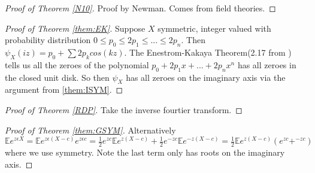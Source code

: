 \documentclass[10pt]{article}
\newcommand{\E}{\mathbb{E}}
\newcommand{\1}{\textbf{1}}
\theoremstyle{remark}
\theoremstyle{definition}
\begin{document}
\begin{proof}[Proof of Theorem \ref{N10}]
	Proof by Newman. Comes from field theories.
\end{proof}


\begin{proof}[Proof of Theorem \ref{them:EK}]
	Suppose $X$ symmetric, integer valued with probability distribution $0 \leq p_0 \leq 2p_1 \leq ... \leq 2p_n$. Then $\psi_X(iz) = p_0 + \sum 2p_k cos(kz)$. The Enestrom-Kakaya Theorem(2.17 from \cite{HP}) tells us all the zeroes of the polynomial $p_0 +2p_1x+...+2p_nx^n$ has all zeroes in the closed unit disk. So then $\psi_X$ has all zeroes on the imaginary axis via the argument from \ref{them:ISYM}.
\end{proof}

\begin{proof}[Proof of Theorem \ref{RDP}]
	Take the inverse fourtier transform.
\end{proof}

\begin{proof}[Proof of Theorem \ref{them:GSYM}]

	Alternatively $\E e^{z \epsilon X} = \E e^{z\epsilon (X-c)}e^{z\epsilon c} = \frac{1}{2}e^{zc}\E e^{z(X-c)}+\frac{1}{2}e^{-zc}\E e^{-z(X-c)} = \frac{1}{2}\E e^{z(X-c)}(e^{zc}+^{-zc})$ where we use symmetry. Note the last term only has roots on the imaginary axis.
\end{proof}
\end{document}
